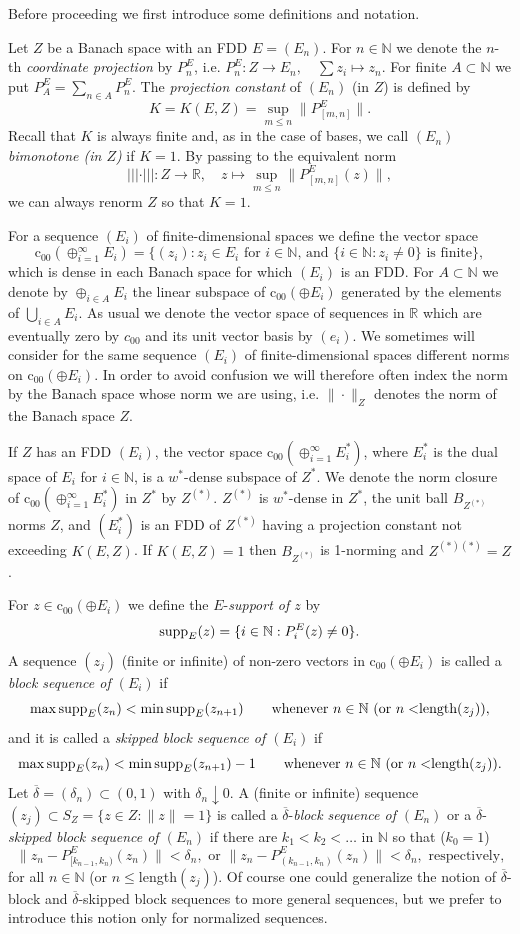 \documentclass[11pt,leqno]{amsart}
\theoremstyle{definition}
\newcommand{\N}{\mathbb{N}}
\newcommand{\R}{\mathbb{R}}
\def\trivert#1{|\!|\!| #1|\!|\!|}
\newcommand{\supp}{{\rm supp}}
\newcommand{\coo}{\mathrm{c}_{00}}
\newcommand{\deltab}{\overline\delta}
\newcommand{\Zs}{Z^{(*)}}
\begin{document}
Before proceeding we  first introduce some
definitions and  notation.

Let $Z$ be a Banach space with an FDD $E=(E_n)$.  For $n\in\N$ we denote
the $n$-th {\em coordinate projection } by $P^E_n$,
i.e. $P_n^E:Z\to E_n,\quad \sum z_i\mapsto z_n.$ For  finite
$A\subset \N$ we put $P^E_A=\sum_{n\in A} P_n^E$. The  {\em projection
  constant  } of $(E_n)$ (in $Z$) is defined by
$$K=K(E,Z)=\sup_{m\le n}\|P_{[m,n]}^E\|.$$
Recall that $K$ is always finite and, as in the case of bases, we call
{\em  $(E_n)$ bimonotone (in $Z$)} if $K=1$.  By passing to the
equivalent norm
$$\trivert{\cdot}:Z\to\R,\quad z\mapsto\sup_{m\le n} \|P^E_{[m,n]}(z)\|,$$
we can always renorm $Z$ so that $K=1$.

For a sequence $(E_i)$ of finite-dimensional spaces
we define the vector space
$$\coo(\oplus_{i=1}^\infty E_i)=\big\{(z_i):z_i\in E_i
\text{ for $i\in\N$, and $\{i\in\N: z_i\not=0\}$ is finite}\big\},$$
which is dense in each Banach space for which $(E_i)$ is an FDD. For
$A\subset \N$ we denote  by $\oplus_{i\in A} E_i$ the linear subspace
of $\coo(\oplus E_i)$ generated by the elements
of $\bigcup_{i\in A}E_i$. As usual we denote the vector space of sequences
in $\R$ which are eventually zero by $c_{00}$ and its  unit vector
basis by $(e_i)$.
We  sometimes will consider for the same sequence $(E_i)$ of
finite-dimensional spaces different norms on $\coo(\oplus
E_i)$. In order to avoid confusion we will therefore often index the
norm by the Banach space whose norm we are using, i.e. $\|\cdot\|_Z$
denotes the norm  of the Banach space $Z$.

If $Z$ has an FDD $(E_i)$, the vector space $\coo(\oplus_{i=1}^\infty
E^*_i)$, where $E^*_i$ is the dual space of $E_i$ for $i\in\N$, is a
$w^*$-dense subspace of $Z^*$. We denote the norm closure of
$\coo(\oplus_{i=1}^\infty E^*_i)$ in $Z^*$ by $\Zs$. $\Zs$ is
$w^*$-dense in $Z^*$, the unit ball $B_{\Zs}$ norms $Z$, and $(E_i^*)$
is an FDD of $\Zs$ having a projection constant not exceeding
$K(E,Z)$. If $K(E,Z)=1$ then $B_{Z^{(*)}}$ is 1-norming and
$Z^{(*)(*)}=Z$.

For $z\in \coo(\oplus E_i)$ we define the $E$-{\em support of $z$} by
\[
\supp_E(z)=\{i\in\N:  P^E_i(z)\not=0\}.
\]
A sequence $(z_j)$ (finite or infinite) of non-zero vectors in
$\coo(\oplus E_i)$ is called  a {\em block sequence of $(E_i)$} if
$$\max\supp_E(z_n)<  \min\supp_E(z_{n+1})\qquad\text{whenever $n\in\N$ (or
  $n<$length$(z_j)$)},$$ and it is called a  {\em skipped block
  sequence of $(E_i)$} if
$$\max\supp_E(z_n)<  \min\supp_E(z_{n+1})-1\qquad\text{whenever $n\in\N$ (or
  $n<$length$(z_j)$)}.$$
Let $\deltab=(\delta_n)\subset (0,1)$ with $\delta_n\downarrow 0$.
A (finite or infinite) sequence $(z_j)\subset S_Z=\{z\in Z:
\|z\|=1\}$ is called a $\deltab$-{\em block sequence of $(E_n)$}
or a $\deltab$-{\em skipped block sequence of $(E_n)$}
if
there are $k_1<k_2<\ldots$ in $\N$ so that ($k_0=1$)
\[
\| z_n - P^E_{[k_{n-1},k_n)}(z_n)\|<\delta_n,\text{ or }\| z_n -
P^E_{(k_{n-1},k_n)}(z_n)\|<\delta_n, \text{ respectively,}
\]
for all $n\in\N$  (or $n\le$length$(z_j)$).
Of course one could generalize the notion of $\deltab$- block and
$\deltab$-skipped block sequences to more general sequences, but
we prefer to introduce this notion only for normalized sequences.
\end{document}
